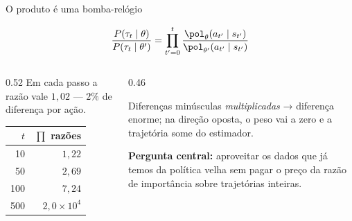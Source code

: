 \documentclass[aspectratio=169, 10pt]{beamer}
\newcommand{\thv}{\theta}
\newcommand{\polth}{\pol_{\thv}}
\newcommand{\traj}{\tau}
\begin{document}
\begin{frame}{O produto é uma bomba-relógio}

  \[
    \frac{P(\traj_t\mid\thv)}{P(\traj_t\mid\thv')}
      = \prod_{t'=0}^{t}\frac{\polth(a_{t'}\mid s_{t'})}{\pol_{\thv'}(a_{t'}\mid s_{t'})}
  \]

  \begin{columns}[T]
  \begin{column}{0.52\textwidth}
    Em cada passo a razão vale $1{,}02$ --- $2\%$ de diferença por ação.

    \medskip
    \begin{center}\small
    \begin{tabular}{@{}rr@{}}
      \toprule
      $t$ & $\prod$ razões \\
      \midrule
      \phantom{0}10 & $1{,}22$ \\
      \phantom{0}50 & $2{,}69$ \\
      100 & $7{,}24$ \\
      500 & $2{,}0\times 10^{4}$ \\
      \bottomrule
    \end{tabular}
    \end{center}
  \end{column}
  \begin{column}{0.46\textwidth}
    \begin{alertabox}
      Diferenças minúsculas \emph{multiplicadas} → diferença enorme; na direção
      oposta, o peso vai a zero e a trajetória some do estimador.
    \end{alertabox}

    \begin{ideiabox}
      \textbf{Pergunta central:} aproveitar os dados que já temos da política
      velha sem pagar o preço da razão de importância sobre trajetórias inteiras.
    \end{ideiabox}
  \end{column}
  \end{columns}
\end{frame}
\end{document}
